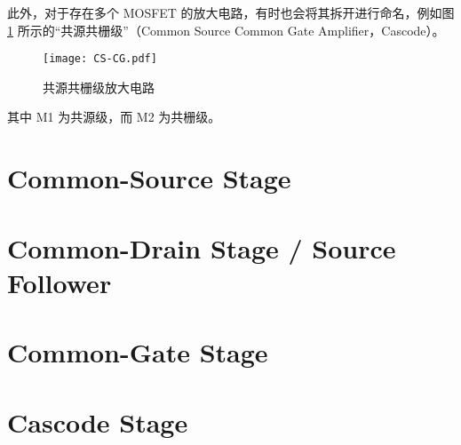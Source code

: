 此外，对于存在多个 MOSFET 的放大电路，有时也会将其拆开进行命名，例如图 \ref{fig:CS-CG} 所示的“共源共栅级”（Common Source Common Gate Amplifier，Cascode）。
\begin{figure}[htp!]
    \centering
    \texttt{[image: CS-CG.pdf]}
    \caption{共源共栅级放大电路}
    \label{fig:CS-CG}
\end{figure}
其中 M1 为共源级，而 M2 为共栅级。

\section{Common-Source Stage}

\section{Common-Drain Stage / Source Follower}

\section{Common-Gate Stage}

\section{Cascode Stage}

